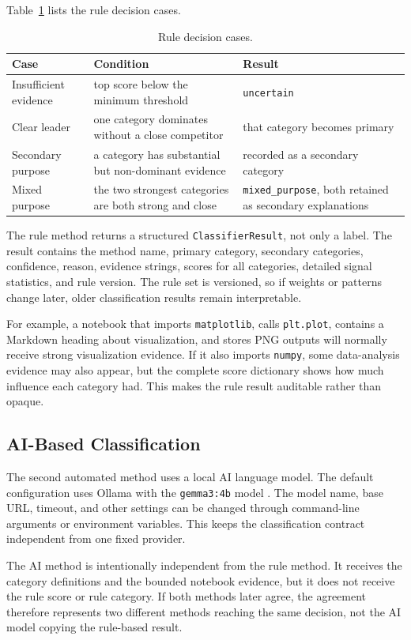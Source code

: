 Table~\ref{tab:rule-decision-cases} lists the rule decision cases.

\begin{table}[ht]
\centering
\caption{Rule decision cases.}
\label{tab:rule-decision-cases}
\small
\begin{tabularx}{\textwidth}{@{}p{3.2cm}p{5.4cm}X@{}}
\toprule
Case & Condition & Result\tabularnewline
\midrule
Insufficient evidence & top score below the minimum threshold & \texttt{uncertain}\tabularnewline
Clear leader & one category dominates without a close competitor & that category becomes primary\tabularnewline
Secondary purpose & a category has substantial but non-dominant evidence & recorded as a secondary category\tabularnewline
Mixed purpose & the two strongest categories are both strong and close & \texttt{mixed\_purpose}, both retained as secondary explanations\tabularnewline
\bottomrule
\end{tabularx}
\end{table}

The rule method returns a structured \texttt{ClassifierResult}, not only a label. The result contains the method name, primary category, secondary categories, confidence, reason, evidence strings, scores for all categories, detailed signal statistics, and rule version. The rule set is versioned, so if weights or patterns change later, older classification results remain interpretable.

For example, a notebook that imports \texttt{matplotlib}, calls \texttt{plt.plot}, contains a Markdown heading about visualization, and stores PNG outputs will normally receive strong visualization evidence. If it also imports \texttt{numpy}, some data-analysis evidence may also appear, but the complete score dictionary shows how much influence each category had. This makes the rule result auditable rather than opaque.

\subsection{AI-Based Classification}

The second automated method uses a local AI language model. The default configuration uses Ollama with the \texttt{gemma3:4b} model \cite{gemma3}. The model name, base URL, timeout, and other settings can be changed through command-line arguments or environment variables. This keeps the classification contract independent from one fixed provider.

The AI method is intentionally independent from the rule method. It receives the category definitions and the bounded notebook evidence, but it does not receive the rule score or rule category. If both methods later agree, the agreement therefore represents two different methods reaching the same decision, not the AI model copying the rule-based result.

